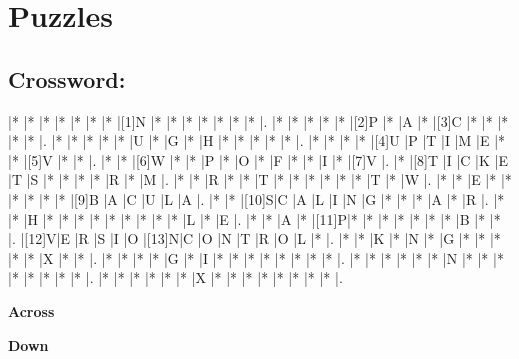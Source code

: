 \documentclass{article}
\begin{document}
\section*{Puzzles}

\subsection*{Crossword:}

\begin{Puzzle}{15}{16} %
|*    |*    |*    |*    |*    |*    |*    |[1]N |*    |*    |*    |*    |*    |*    |*    |.
|*    |*    |*    |*    |*    |[2]P |*    |A    |*    |[3]C |*    |*    |*    |*    |*    |.
|*    |*    |*    |*    |*    |U    |*    |G    |*    |H    |*    |*    |*    |*    |*    |.
|*    |*    |*    |*    |[4]U |P    |T    |I    |M    |E    |*    |*    |[5]V |*    |*    |.
|*    |*    |[6]W |*    |*    |P    |*    |O    |*    |F    |*    |*    |I    |*    |[7]V |.
|*    |[8]T |I    |C    |K    |E    |T    |S    |*    |*    |*    |*    |R    |*    |M    |.
|*    |*    |R    |*    |*    |T    |*    |*    |*    |*    |*    |*    |T    |*    |W    |.
|*    |*    |E    |*    |*    |*    |*    |*    |*    |[9]B |A    |C    |U    |L    |A    |.
|*    |*    |[10]S|C    |A    |L    |I    |N    |G    |*    |*    |*    |A    |*    |R    |.
|*    |*    |H    |*    |*    |*    |*    |*    |*    |*    |*    |*    |L    |*    |E    |.
|*    |*    |A    |*    |[11]P|*    |*    |*    |*    |*    |*    |*    |B    |*    |*    |.
|[12]V|E    |R    |S    |I    |O    |[13]N|C    |O    |N    |T    |R    |O    |L    |*    |.
|*    |*    |K    |*    |N    |*    |G    |*    |*    |*    |*    |*    |X    |*    |*    |.
|*    |*    |*    |*    |G    |*    |I    |*    |*    |*    |*    |*    |*    |*    |*    |.
|*    |*    |*    |*    |*    |*    |N    |*    |*    |*    |*    |*    |*    |*    |*    |.
|*    |*    |*    |*    |*    |*    |X    |*    |*    |*    |*    |*    |*    |*    |*    |.
\end{Puzzle}


\begin{PuzzleClues}{\textbf{Across}} %
\end{PuzzleClues} %
%
\begin{PuzzleClues}{\textbf{Down}}
\end{PuzzleClues}
\end{document}
